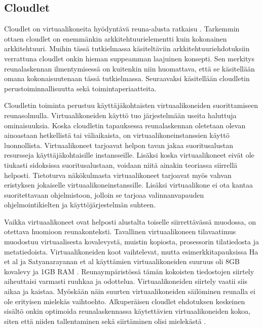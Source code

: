 \subsection{Cloudlet} \label{cloudlet}


Cloudlet on virtuaalikoneita hyödyntävä reuna-alusta ratkaisu \cite{satya09}.
Tarkemmin ottaen cloudlet on enemmänkin arkkitehtuurielementti kuin kokonainen arkkitehtuuri. Muihin tässä tutkielmassa käsiteltäviin arkkitehtuuriehdotuksiin verrattuna cloudlet onkin hieman suppeamman laajuinen konsepti.
Sen merkitys reunalaskennan ilmentymisessä on kuitenkin niin huomattava, että se käsitellään omana kokonaisuutenaan tässä tutkielmassa.
Seuraavaksi käsitellään cloudletin perustoiminnallisuutta sekä toimintaperiaatteita.

Cloudletin toiminta perustuu käyttäjäkohtaisten virtuaalikoneiden suorittamiseen reunasolmulla.
Virtuaalikoneiden käyttö tuo järjestelmään useita haluttuja ominaisuuksia.
Koska cloudletin tapauksessa reunalaskennan oletetaan olevan ainoastaan hetkellistä tai väliaikaista\cite{satya09}, on virtuaalikoneinstanssien käyttö luonnollista.
Virtuaalikoneet tarjoavat helpon tavan jakaa suoritusalustan resursseja käyttäjäkohtaisille instansseille. 
Lisäksi koska virtuaalikoneet eivät ole tiukasti sidoksissa suoritusalustaan, voidaan niitä ainakin teoriassa siirrellä helposti.
Tietoturva näkökulmasta virtuaalikoneet tarjoavat myös vahvan eristyksen jokaiselle virtuaalikoneinstanssille. \cite{ha2015adaptive} 
Lisäksi virtuaalikone ei ota kantaa suoritettavaan ohjelmistoon, jolloin se tarjoaa valinnanvapauden ohjelmointikielten ja käyttöjärjestelmän suhteen.

Vaikka virtuaalikoneet ovat helposti alustalta toiselle siirrettävässä muodossa, on otettava huomioon reunakonteksti. Tavallinen virtuaalikoneen tilavaatimus muodostuu virtuaalisesta kovalevystä, muistin kopiosta, prosessorin tilatiedosta ja metatiedoista.  
Virtuaalikoneiden koot vaihtelevat, mutta esimerkkitapauksissa Ha et al ja Satyanarayanan et al käyttämien virtuaalikoneiden suuruus oli 8GB kovalevy ja  1GB RAM \cite{ha2013just, satya09}. Reunaympäristössä tämän kokoisten tiedostojen siirtely aiheuttaisi varmasti ruuhkaa ja odottelua.
Virtuaalikoneiden siirtely vaatii siis aikaa ja kaistaa. Myöskään näin suurten virtuaalikoneiden säilöminen reunalla ei ole erityisen mielekäs vaihtoehto.
Alkuperäisen cloudlet ehdotuksen keskeinen sisältö onkin optimoida reunalaskennassa käytettävien virtuaalikoneiden kokoa, siten että niiden tallentaminen sekä siirtäminen olisi mielekästä \cite{satya09}.


